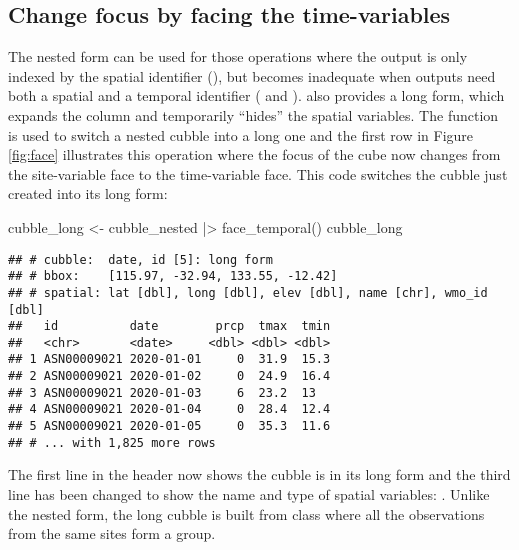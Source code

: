 \documentclass{article}
\newenvironment{Shaded}{\begin{snugshade}}{\end{snugshade}}
\newcommand{\FunctionTok}[1]{\textcolor[rgb]{0.00,0.00,0.00}{#1}}
\newcommand{\NormalTok}[1]{#1}
\newcommand{\OtherTok}[1]{\textcolor[rgb]{0.56,0.35,0.01}{#1}}
\newcommand{\SpecialCharTok}[1]{\textcolor[rgb]{0.00,0.00,0.00}{#1}}
\begin{document}
\hypertarget{change-focus-by-facing-the-time-variables}{%
\subsection{Change focus by facing the time-variables}\label{change-focus-by-facing-the-time-variables}}

The nested form can be used for those operations where the output is only indexed by the spatial identifier (), but becomes inadequate when outputs need both a spatial and a temporal identifier ( and ).  also provides a long form, which expands the  column and temporarily ``hides'' the spatial variables. The function  is used to switch a nested cubble into a long one and the first row in Figure \ref{fig:face} illustrates this operation where the focus of the cube now changes from the site-variable face to the time-variable face. This code switches the cubble just created into its long form:

\begin{Shaded}
\begin{Highlighting}[]
\NormalTok{cubble\_long }\OtherTok{\textless{}{-}}\NormalTok{ cubble\_nested }\SpecialCharTok{|\textgreater{}} \FunctionTok{face\_temporal}\NormalTok{()}
\NormalTok{cubble\_long}
\end{Highlighting}
\end{Shaded}

\begin{verbatim}
## # cubble:  date, id [5]: long form
## # bbox:    [115.97, -32.94, 133.55, -12.42]
## # spatial: lat [dbl], long [dbl], elev [dbl], name [chr], wmo_id [dbl]
##   id          date        prcp  tmax  tmin
##   <chr>       <date>     <dbl> <dbl> <dbl>
## 1 ASN00009021 2020-01-01     0  31.9  15.3
## 2 ASN00009021 2020-01-02     0  24.9  16.4
## 3 ASN00009021 2020-01-03     6  23.2  13  
## 4 ASN00009021 2020-01-04     0  28.4  12.4
## 5 ASN00009021 2020-01-05     0  35.3  11.6
## # ... with 1,825 more rows
\end{verbatim}

The first line in the header now shows the cubble is in its long form and the third line has been changed to show the name and type of spatial variables: . Unlike the nested form, the long cubble is built from class  where all the observations from the same sites form a group.
\end{document}
